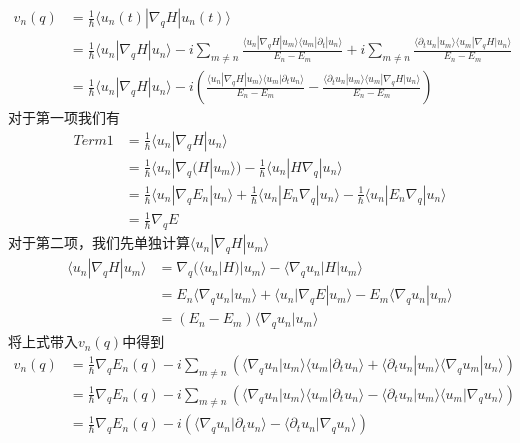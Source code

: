 \documentclass{article}
\numberwithin{equation}{subsection}
\begin{document}
\begin{equation}
    \begin{split}
        v_n(q)&=\frac{1}{\hbar}\langle u_n(t)|\nabla_q H|u_n(t)\rangle\\
        &=\frac{1}{\hbar}\langle u_n|\nabla_qH|u_n\rangle-i\sum_{m\neq n}\frac{\langle u_n|\nabla_qH|u_m\rangle\langle u_m|\partial_t|u_n\rangle}{E_n-E_m}+i\sum_{m\neq n}\frac{\langle\partial_t u_n|u_m\rangle\langle u_m|\nabla_qH|u_n\rangle}{E_n-E_m}\\
        &=\frac{1}{\hbar}\langle u_n|\nabla_qH|u_n\rangle-i\left(\frac{\langle u_n|\nabla_qH|u_m\rangle\langle u_m|\partial_t u_n\rangle}{E_n-E_m}-\frac{\langle\partial_t u_n|u_m\rangle\langle u_m|\nabla_qH|u_n\rangle}{E_n-E_m}\right)
    \end{split}
\end{equation}
对于第一项我们有
\begin{equation}
    \begin{split}
        Term1&=\frac{1}{\hbar}\langle u_n|\nabla_qH|u_n\rangle\\
        &=\frac{1}{\hbar}\langle u_n|\nabla_q(H|u_m\rangle)-\frac{1}{\hbar}\langle u_n|H\nabla_q|u_n\rangle\\
        &=\frac{1}{\hbar}\langle u_n|\nabla_qE_n|u_n\rangle+\frac{1}{\hbar}\langle u_n|E_n\nabla_q|u_n\rangle-\frac{1}{\hbar}\langle u_n|E_n\nabla_q|u_n\rangle\\
        &=\frac{1}{\hbar}\nabla_qE
    \end{split}
\end{equation}
对于第二项，我们先单独计算$\langle u_n|\nabla_qH|u_m\rangle$
\begin{equation}
    \begin{split}
        \langle u_n|\nabla_qH|u_m\rangle&=\nabla_q(\langle u_n|H)|u_m\rangle-\langle\nabla_qu_n|H|u_m\rangle\\
        &=E_n\langle\nabla_q u_n|u_m\rangle+\langle u_n|\nabla_qE|u_m\rangle-E_m\langle\nabla_qu_n|u_m\rangle\\
        &=(E_n-E_m)\langle\nabla_qu_n|u_m\rangle
    \end{split}
\end{equation}
将上式带入$v_n(q)$中得到
\begin{equation}
    \begin{split}
        v_n(q)&=\frac{1}{\hbar}\nabla_qE_n(q)-i\sum_{m\neq n}\left(\langle\nabla_qu_n|u_m\rangle\langle u_m|\partial_tu_n\rangle+\langle\partial_tu_n|u_m\rangle\langle\nabla_qu_m|u_n\rangle\right)\\
        &=\frac{1}{\hbar}\nabla_qE_n(q)-i\sum_{m\neq n}\left(\langle\nabla_qu_n|u_m\rangle\langle u_m|\partial_tu_n\rangle-\langle\partial_tu_n|u_m\rangle\langle u_m|\nabla_qu_n\rangle\right)\\
        &=\frac{1}{\hbar}\nabla_qE_n(q)-i\left(\langle\nabla_qu_n|\partial_tu_n\rangle-\langle\partial_tu_n|\nabla_qu_n\rangle\right)
    \end{split}
\end{equation}
\end{document}
